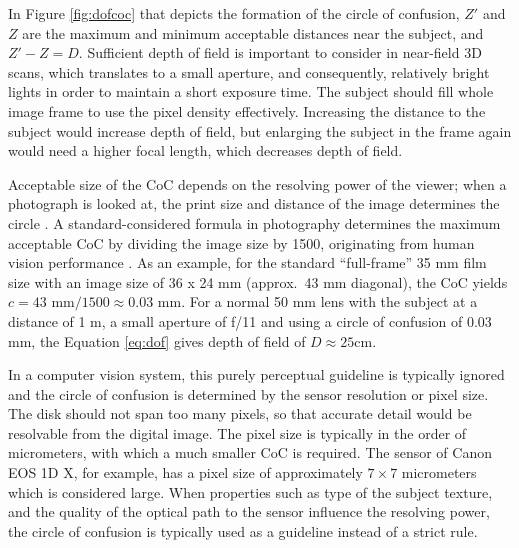 In Figure \ref{fig:dofcoc} that depicts the formation of the circle of confusion, $Z'$ and $Z$ are the maximum and minimum acceptable distances near the subject, and $Z' - Z = D$.
Sufficient depth of field is important to consider in near-field 3D scans, which translates to a small aperture, and consequently, relatively bright lights in order to maintain a short exposure time.
The subject should fill whole image frame to use the pixel density effectively.
Increasing the distance to the subject would increase depth of field, but enlarging the subject in the frame again would need a higher focal length, which decreases depth of field.

Acceptable size of the CoC depends on the resolving power of the viewer; when a photograph is looked at, the print size and distance of the image determines the circle \cite{greenleaf1950photographic}.
A standard-considered formula in photography determines the maximum acceptable CoC by dividing the image size by 1500, originating from human vision performance \cite[p. 88, 92]{kingslake1992optics}.
As an example, for the standard ``full-frame'' 35 mm film size with an image size of 36 x 24 mm (approx.\ 43 mm diagonal), the CoC yields $c = 43 \text{ mm} / 1500 \approx 0.03 \text{ mm}$.
For a normal 50 mm lens with the subject at a distance of 1 m, a small aperture of f/11 and using a circle of confusion of 0.03 mm, the Equation \ref{eq:dof} gives depth of field of $D \approx 25 \text{cm}$.

In a computer vision system, this purely perceptual guideline is typically ignored and the circle of confusion is determined by the sensor resolution or pixel size.
The disk should not span too many pixels, so that accurate detail would be resolvable from the digital image.
The pixel size is typically in the order of micrometers, with which a much smaller CoC is required.
The sensor of Canon EOS 1D X, for example, has a pixel size of approximately $7 \times 7$ micrometers \cite{eos1dx} which is considered large.
When properties such as type of the subject texture, and the quality of the optical path to the sensor influence the resolving power, the circle of confusion is typically used as a guideline instead of a strict rule.


